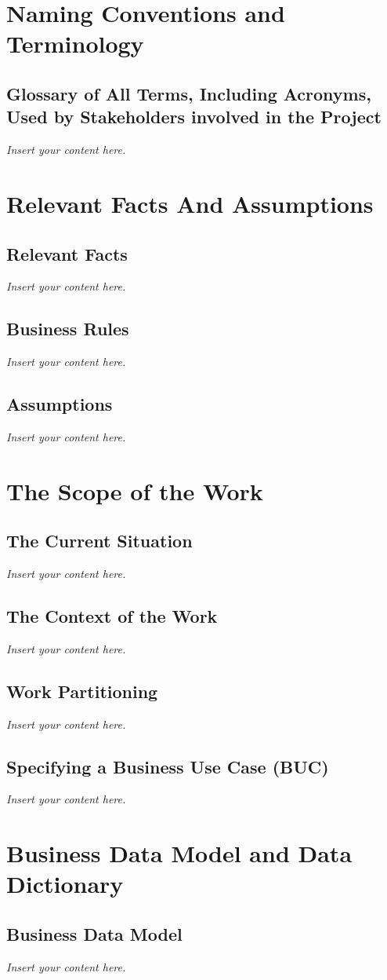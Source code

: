 \documentclass[12pt]{article}
\newcommand{\lips}{\textit{Insert your content here.}}
\begin{document}
\section{Naming Conventions and Terminology}
\subsection{Glossary of All Terms, Including Acronyms, Used by Stakeholders
involved in the Project}
\lips

\section{Relevant Facts And Assumptions}
\subsection{Relevant Facts}
\lips
\subsection{Business Rules}
\lips
\subsection{Assumptions}
\lips

\section{The Scope of the Work}
\subsection{The Current Situation}
\lips
\subsection{The Context of the Work}
\lips
\subsection{Work Partitioning}
\lips
\subsection{Specifying a Business Use Case (BUC)}
\lips

\section{Business Data Model and Data Dictionary}
\subsection{Business Data Model}
\lips
\end{document}
